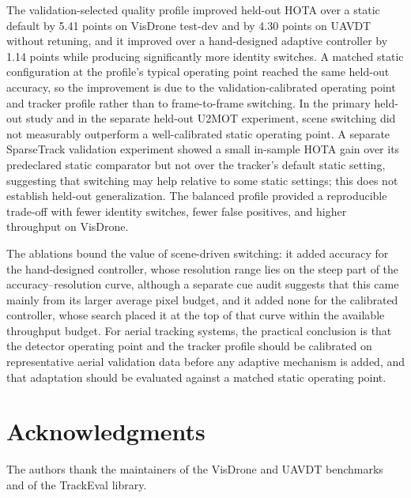 \documentclass[journal]{new-aiaa}
\begin{document}
The validation-selected quality profile improved held-out HOTA over a static default by 5.41 points on VisDrone test-dev and by 4.30 points on UAVDT without retuning, and it improved over a hand-designed adaptive controller by 1.14 points while producing significantly more identity switches. A matched static configuration at the profile's typical operating point reached the same held-out accuracy, so the improvement is due to the validation-calibrated operating point and tracker profile rather than to frame-to-frame switching. In the primary held-out study and in the separate held-out U2MOT experiment, scene switching did not measurably outperform a well-calibrated static operating point. A separate SparseTrack validation experiment showed a small in-sample HOTA gain over its predeclared static comparator but not over the tracker's default static setting, suggesting that switching may help relative to some static settings; this does not establish held-out generalization. The balanced profile provided a reproducible trade-off with fewer identity switches, fewer false positives, and higher throughput on VisDrone.

The ablations bound the value of scene-driven switching: it added accuracy for the hand-designed controller, whose resolution range lies on the steep part of the accuracy--resolution curve, although a separate cue audit suggests that this came mainly from its larger average pixel budget, and it added none for the calibrated controller, whose search placed it at the top of that curve within the available throughput budget. For aerial tracking systems, the practical conclusion is that the detector operating point and the tracker profile should be calibrated on representative aerial validation data before any adaptive mechanism is added, and that adaptation should be evaluated against a matched static operating point.

\section*{Acknowledgments}
The authors thank the maintainers of the VisDrone and UAVDT benchmarks and of the TrackEval library.


\end{document}
